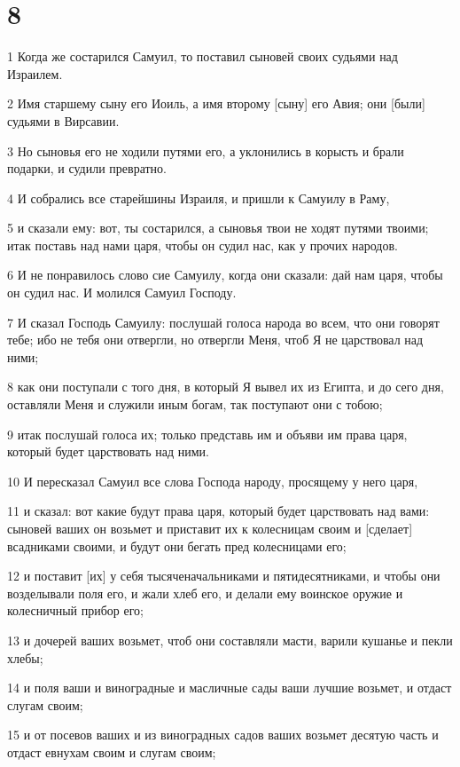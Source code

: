 \chapter{8}

\par 1 Когда же состарился Самуил, то поставил сыновей своих судьями над Израилем.
\par 2 Имя старшему сыну его Иоиль, а имя второму [сыну] его Авия; они [были] судьями в Вирсавии.
\par 3 Но сыновья его не ходили путями его, а уклонились в корысть и брали подарки, и судили превратно.
\par 4 И собрались все старейшины Израиля, и пришли к Самуилу в Раму,
\par 5 и сказали ему: вот, ты состарился, а сыновья твои не ходят путями твоими; итак поставь над нами царя, чтобы он судил нас, как у прочих народов.
\par 6 И не понравилось слово сие Самуилу, когда они сказали: дай нам царя, чтобы он судил нас. И молился Самуил Господу.
\par 7 И сказал Господь Самуилу: послушай голоса народа во всем, что они говорят тебе; ибо не тебя они отвергли, но отвергли Меня, чтоб Я не царствовал над ними;
\par 8 как они поступали с того дня, в который Я вывел их из Египта, и до сего дня, оставляли Меня и служили иным богам, так поступают они с тобою;
\par 9 итак послушай голоса их; только представь им и объяви им права царя, который будет царствовать над ними.
\par 10 И пересказал Самуил все слова Господа народу, просящему у него царя,
\par 11 и сказал: вот какие будут права царя, который будет царствовать над вами: сыновей ваших он возьмет и приставит их к колесницам своим и [сделает] всадниками своими, и будут они бегать пред колесницами его;
\par 12 и поставит [их] у себя тысяченачальниками и пятидесятниками, и чтобы они возделывали поля его, и жали хлеб его, и делали ему воинское оружие и колесничный прибор его;
\par 13 и дочерей ваших возьмет, чтоб они составляли масти, варили кушанье и пекли хлебы;
\par 14 и поля ваши и виноградные и масличные сады ваши лучшие возьмет, и отдаст слугам своим;
\par 15 и от посевов ваших и из виноградных садов ваших возьмет десятую часть и отдаст евнухам своим и слугам своим;
